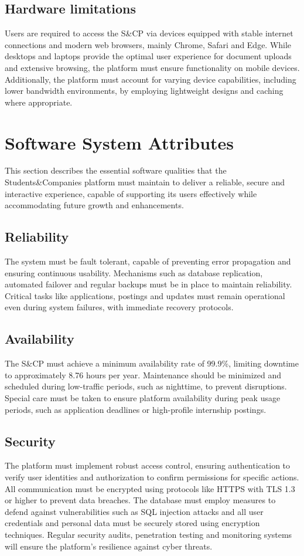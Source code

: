 \subsection{Hardware limitations}
Users are required to access the S\&CP via devices equipped with stable internet connections and modern web browsers, mainly Chrome, Safari and Edge.
While desktops and laptops provide the optimal user experience for document uploads and extensive browsing, the platform must ensure functionality on mobile devices.
Additionally, the platform must account for varying device capabilities, including lower bandwidth environments, by employing lightweight designs and caching where appropriate.

\section{Software System Attributes}
This section describes the essential software qualities that the Students\&Companies platform must maintain to deliver a reliable, secure and interactive experience, capable of supporting its users effectively while accommodating future growth and enhancements.

\subsection{Reliability}
The system must be fault tolerant, capable of preventing error propagation and ensuring continuous usability.
Mechanisms such as database replication, automated failover and regular backups must be in place to maintain reliability.
Critical tasks like applications, postings and updates must remain operational even during system failures, with immediate recovery protocols.

\subsection{Availability}
The S\&CP must achieve a minimum availability rate of 99.9\%, limiting downtime to approximately 8.76 hours per year.
Maintenance should be minimized and scheduled during low-traffic periods, such as nighttime, to prevent disruptions.
Special care must be taken to ensure platform availability during peak usage periods, such as application deadlines or high-profile internship postings.

\subsection{Security}
The platform must implement robust access control, ensuring authentication to verify user identities and authorization to confirm permissions for specific actions.
All communication must be encrypted using protocols like HTTPS with TLS 1.3 or higher to prevent data breaches.
The database must employ measures to defend against vulnerabilities such as SQL injection attacks and all user credentials and personal data must be securely stored using encryption techniques.
Regular security audits, penetration testing and monitoring systems will ensure the platform's resilience against cyber threats.

